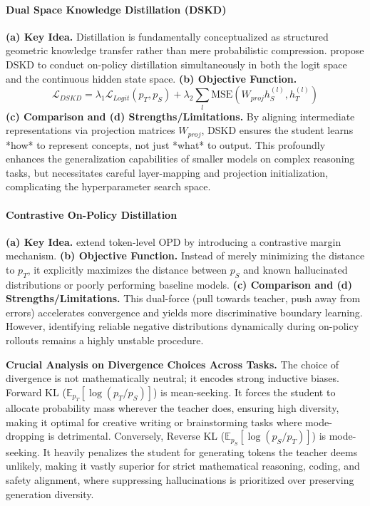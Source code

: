 \documentclass{article} %
\begin{document}
\paragraph{Dual Space Knowledge Distillation (DSKD)}
\textbf{(a) Key Idea.} Distillation is fundamentally conceptualized as structured geometric knowledge transfer rather than mere probabilistic compression. \citet{2502.12018} propose DSKD to conduct on-policy distillation simultaneously in both the logit space and the continuous hidden state space. 
\textbf{(b) Objective Function.}
\begin{equation}
    \mathcal{L}_{DSKD} = \lambda_1 \mathcal{L}_{Logit}(p_T, p_S) + \lambda_2 \sum_{l} \text{MSE}\left( W_{proj} h_S^{(l)}, h_T^{(l)} \right)
\end{equation}
\textbf{(c) Comparison and (d) Strengths/Limitations.} By aligning intermediate representations via projection matrices $W_{proj}$, DSKD ensures the student learns *how* to represent concepts, not just *what* to output. This profoundly enhances the generalization capabilities of smaller models on complex reasoning tasks, but necessitates careful layer-mapping and projection initialization, complicating the hyperparameter search space.

\paragraph{Contrastive On-Policy Distillation}
\textbf{(a) Key Idea.} \citet{2403.14608} extend token-level OPD by introducing a contrastive margin mechanism. 
\textbf{(b) Objective Function.} Instead of merely minimizing the distance to $p_T$, it explicitly maximizes the distance between $p_S$ and known hallucinated distributions or poorly performing baseline models.
\textbf{(c) Comparison and (d) Strengths/Limitations.} This dual-force (pull towards teacher, push away from errors) accelerates convergence and yields more discriminative boundary learning. However, identifying reliable negative distributions dynamically during on-policy rollouts remains a highly unstable procedure.

\textbf{Crucial Analysis on Divergence Choices Across Tasks.} The choice of divergence is not mathematically neutral; it encodes strong inductive biases. Forward KL ($\mathbb{E}_{p_T}[\log(p_T/p_S)]$) is mean-seeking. It forces the student to allocate probability mass wherever the teacher does, ensuring high diversity, making it optimal for creative writing or brainstorming tasks where mode-dropping is detrimental. Conversely, Reverse KL ($\mathbb{E}_{p_S}[\log(p_S/p_T)]$) is mode-seeking. It heavily penalizes the student for generating tokens the teacher deems unlikely, making it vastly superior for strict mathematical reasoning, coding, and safety alignment, where suppressing hallucinations is prioritized over preserving generation diversity.
\end{document}
